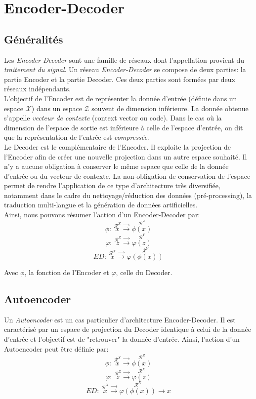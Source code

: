 \section{Encoder-Decoder}
\label{encoderDec}
\subsection{Généralités}
Les \textit{Encoder-Decoder} sont une famille de réseaux dont l'appellation provient du \textit{traitement du signal}. Un réseau \textit{Encoder-Decoder} se compose de deux parties: la partie Encoder et la partie Decoder. Ces deux parties sont formées par deux réseaux indépendants.\\

\noindent L'objectif de l'Encoder est de représenter la donnée d'entrée (définie dans un espace $\mathcal{X}$) dans un espace $\mathcal{Z}$ souvent de dimension inférieure. La donnée obtenue s'appelle \textit{vecteur de contexte} (context vector ou code). Dans le cas où la dimension de l'espace de sortie est inférieure à celle de l'espace d'entrée, on dit que la représentation de l'entrée est \textit{compressée}. \\

\noindent Le Decoder est le complémentaire de l'Encoder. Il exploite la projection de l'Encoder afin de créer une nouvelle projection dans un autre espace souhaité. Il n'y a aucune obligation à conserver le même espace que celle de la donnée d'entrée ou du vecteur de contexte. La non-obligation de conservation de l'espace permet de rendre l'application de ce type d'architecture très diversifiée, notamment dans le cadre du nettoyage/réduction des données (pré-processing), la traduction multi-langue et la génération de données artificielles.\\

\noindent Ainsi, nous pouvons résumer l'action d'un Encoder-Decoder par:
$$\phi: \ \stackrel{\mathcal{R}^X}{x} \stackrel{\rightarrow}{\longrightarrow} \stackrel{\mathcal{R}^Z}{\phi(x)}$$
$$\varphi: \ \stackrel{\mathcal{R}^Z}{z} \stackrel{\rightarrow}{\longrightarrow} \stackrel{\mathcal{R}^Y}{\varphi(z)}$$
$$ED: \ \stackrel{\mathcal{R}^X}{x} \stackrel{\rightarrow}{\longrightarrow} \stackrel{\mathcal{R}^Y}{\varphi(\phi(x))}$$

\noindent Avec $\phi$, la fonction de l'Encoder et $\varphi$, celle du Decoder.

\subsection{Autoencoder}
Un \textit{Autoencoder}\cite{autoencoder} est un cas particulier d'architecture Encoder-Decoder. Il est caractérisé par un espace de projection du Decoder identique à celui de la donnée d'entrée et l'objectif est de "retrouver" la donnée d'entrée. Ainsi, l'action d'un Autoencoder peut être définie par:
$$\phi: \ \stackrel{\mathcal{R}^X}{x} \stackrel{\rightarrow}{\longrightarrow} \stackrel{\mathcal{R}^Z}{\phi(x)}$$
$$\varphi: \ \stackrel{\mathcal{R}^Z}{z} \stackrel{\rightarrow}{\longrightarrow} \stackrel{\mathcal{R}^X}{\varphi(z)}$$
$$ED: \ \stackrel{\mathcal{R}^X}{x} \stackrel{\rightarrow}{\longrightarrow} \stackrel{\mathcal{R}^X}{\varphi(\phi(x))} \rightarrow x$$

